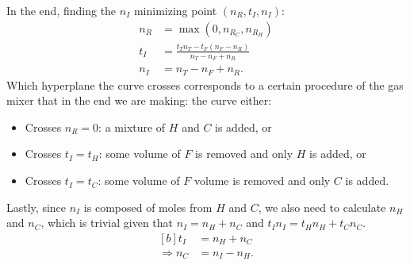 \documentclass{article}
\begin{document}
In the end, finding the $n_I$ minimizing point $(n_R,t_I,n_I)$:
\begin{align}
    n_R &= \max(0, n_{R_C}, n_{R_H}) \label{eq:nR} \\
    t_I &= \frac{t_T n_T-t_F(n_F-n_R)}{n_T-n_F+n_R} \label{eq:tI} \\
    n_I &= n_T-n_F+n_R. \label{eq:nI}
\end{align}
Which hyperplane the curve crosses corresponds to a certain procedure of
the gas mixer that in the end we are making:
the curve either:
\begin{itemize}
    \item Crosses $n_R=0$:
        a mixture of $H$ and $C$ is added, or
    \item Crosses $t_I=t_H$:
        some volume of $F$ is removed and only $H$ is added, or
    \item Crosses $t_I=t_C$:
        some volume of $F$ volume is removed and only $C$ is added.
\end{itemize}
%
Lastly, since $n_I$ is composed of moles from $H$ and $C$,
we also need to calculate $n_H$ and $n_C$,
which is trivial given that $n_I=n_H+n_C$ and $t_I n_I=t_H n_H+t_C n_C$.
\begin{equation}\label{eq:nC}
    \begin{aligned}[b]
        t_I &= n_H+n_C \\
        \Rightarrow n_C &= n_I-n_H.
    \end{aligned}
\end{equation}
\end{document}
